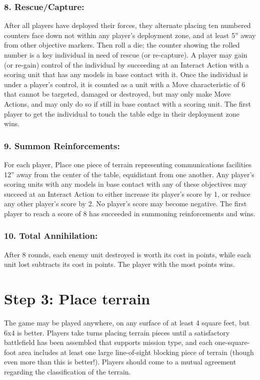 \begin{multicols}{2}
\subsubsection*{8. Rescue/Capture:} After all players have deployed their forces, they alternate placing ten numbered counters face down not within any player's deployment zone, and at least 5'' away from other objective markers. Then roll a die; the counter showing the rolled number is a key individual in need of rescue (or re-capture). A player may gain (or re-gain) control of the individual by succeeding at an Interact Action with a scoring unit that has any models in base contact with it. Once the individual is under a player's control, it is counted as a unit with a Move characteristic of 6 that cannot be targeted, damaged or destroyed, but may only make Move Actions, and may only do so if still in base contact with a scoring unit. The first player to get the individual to touch the table edge in their deployment zone wins.

\subsubsection*{9. Summon Reinforcements:} For each player, Place one piece of terrain representing communications facilities 12'' away from the center of the table, equidistant from one another. Any player's scoring units with any models in base contact with any of these objectives may succeed at an Interact Action to either increase its player's score by 1, or reduce any other player's score by 2. No player's score may become negative. The first player to reach a score of 8 has succeeded in summoning reinforcements and wins.

\subsubsection*{10. Total Annihilation:} After 8 rounds, each enemy unit destroyed is worth its cost in points, while each unit lost subtracts its cost in points. The player with the most points wins.




\section*{Step 3: Place terrain}
The game may be played anywhere, on any surface of at least 4 square feet, but 6x4 is better. Players take turns placing terrain pieces until a satisfactory battlefield has been assembled that supports mission type, and each one-square-foot area includes at least one large line-of-sight blocking piece of terrain (though even more than this is better!). Players should come to a mutual agreement regarding the classification of the terrain.





\end{multicols}
